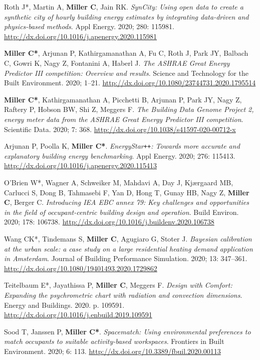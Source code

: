 \documentclass[10pt,a4paper]{article}
\begin{document}
\begin{small}
\begin{etaremune}
\item
Roth J*, Martin A, \textbf{Miller C}, Jain RK. \emph{SynCity: Using open data to create a synthetic city of hourly building energy estimates by integrating data-driven and physics-based methods}. Appl Energy. 2020; 280: 115981. \url{http://dx.doi.org/10.1016/j.apenergy.2020.115981}
\item
\textbf{Miller C*}, Arjunan P, Kathirgamanathan A, Fu C, Roth J, Park JY, Balbach C, Gowri K, Nagy Z, Fontanini A, Haberl J.\emph{ The ASHRAE Great Energy Predictor III competition: Overview and results}. Science and Technology for the Built Environment. 2020; 1–21. \url{http://dx.doi.org/10.1080/23744731.2020.1795514}
\item
\textbf{Miller C*}, Kathirgamanathan A, Picchetti B, Arjunan P, Park JY, Nagy Z, Raftery P, Hobson BW, Shi Z, Meggers F. \emph{The Building Data Genome Project 2, energy meter data from the ASHRAE Great Energy Predictor III competition}. Scientific Data. 2020; 7: 368. \url{http://dx.doi.org/10.1038/s41597-020-00712-x}
\item
Arjunan P, Poolla K, \textbf{Miller C*}. \emph{EnergyStar\texttt{+}\texttt{+}: Towards more accurate and explanatory building energy benchmarking}. Appl Energy. 2020; 276: 115413. \url{http://dx.doi.org/10.1016/j.apenergy.2020.115413}
\item
O’Brien W*, Wagner A, Schweiker M, Mahdavi A, Day J, Kjærgaard MB, Carlucci S, Dong B, Tahmasebi F, Yan D, Hong T, Gunay HB, Nagy Z, \textbf{Miller C}, Berger C. \emph{Introducing IEA EBC annex 79: Key challenges and opportunities in the field of occupant-centric building design and operation}. Build Environ. 2020; 178: 106738. \url{http://dx.doi.org/10.1016/j.buildenv.2020.106738}
\item
Wang CK*, Tindemans S, \textbf{Miller C}, Agugiaro G, Stoter J. \emph{Bayesian calibration at the urban scale: a case study on a large residential heating demand application in Amsterdam}. Journal of Building Performance Simulation. 2020; 13: 347–361. \url{http://dx.doi.org/10.1080/19401493.2020.1729862}
\item
Teitelbaum E*, Jayathissa P, \textbf{Miller C}, Meggers F. \emph{Design with Comfort: Expanding the psychrometric chart with radiation and convection dimensions}. Energy and Buildings. 2020. p. 109591. \url{http://dx.doi.org/10.1016/j.enbuild.2019.109591}
\item
Sood T, Janssen P, \textbf{Miller C*}. \emph{Spacematch: Using environmental preferences to match occupants to suitable activity-based workspaces}. Frontiers in Built Environment. 2020; 6: 113. \url{http://dx.doi.org/10.3389/fbuil.2020.00113}

\end{etaremune}
\end{small}
\end{document}
